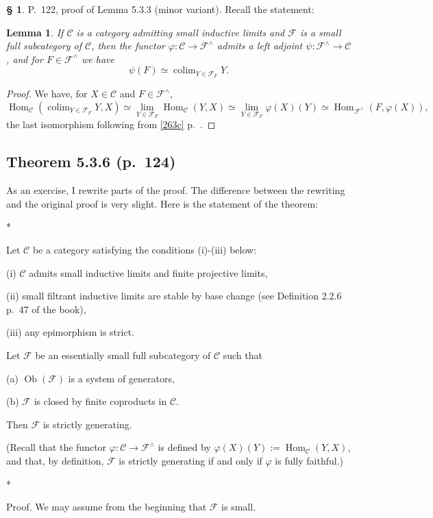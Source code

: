 \documentclass[12pt]{article}%
\newtheorem{lem}[thm]{Lemma}
\theoremstyle{remark}
\theoremstyle{definition}
\newtheorem{s}[thm]{\S}%
\newcommand{\C}{\mathcal C}
\newcommand{\F}{\mathcal F}
\DeclareMathOperator*{\colim}{colim}
\DeclareMathOperator{\Hom}{Hom}%
\DeclareMathOperator{\Ob}{Ob}
\begin{document}
%

\begin{s} 
P.~122, proof of Lemma 5.3.3 (minor variant). Recall the statement: 

\begin{lem}
If $\C$ is a category admitting small inductive limits and $\F$ is a small full subcategory of $\C$, then the functor $\varphi:\C\to\F^\wedge$ admits a left adjoint $\psi:\F^\wedge\to\C$, and for $F\in\F^\wedge$ we have 
$$
\psi(F)\simeq\colim_{Y\in\F_F}Y. 
$$ 
\end{lem} 

\begin{proof}
We have, for $X\in\C$ and $F\in\F^\wedge$, 
$$
\Hom_\C\left(\colim_{Y\in\F_F}Y,X\right)\simeq\lim_{Y\in\F_F}\Hom_\C(Y,X)
\simeq\lim_{Y\in\F_F}\varphi(X)(Y)\simeq\Hom_{\F^\wedge}(F,\varphi(X)),
$$  
the last isomorphism following from \eqref{263c} p.~\pageref{263c}.
\end{proof}
\end{s}


\subsection{Theorem 5.3.6 (p.~124)}\label{536}

As an exercise, I rewrite parts of the proof. The difference between the rewriting and the original proof is very slight. Here is the statement of the theorem:
%
\begin{center}*\end{center}
%
Let $\C$ be a category satisfying the conditions (i)-(iii) below:

\noindent (i) $\C$ admits small inductive limits and finite projective limits, 

\noindent (ii) small filtrant inductive limits are stable by base change (see Definition 2.2.6 p.~47 of the book), 

\noindent (iii) any epimorphism is strict.

\noindent Let $\F$ be an essentially small full subcategory of $\C$ such that 

\noindent (a) $\Ob(\F)$ is a system of generators,

\noindent (b) $\F$ is closed by finite coproducts in $\C$. 

\noindent Then $\F$ is strictly generating.

(Recall that the functor $\varphi:\C\to\F^\wedge$ is defined by $\varphi(X)(Y):=\Hom_\C(Y,X)$, and that, by definition, $\F$ is strictly generating if and only if $\varphi$ is fully faithful.)
%
\begin{center}*\end{center}
%
Proof. We may assume from the beginning that $\F$ is small.
\end{document}
